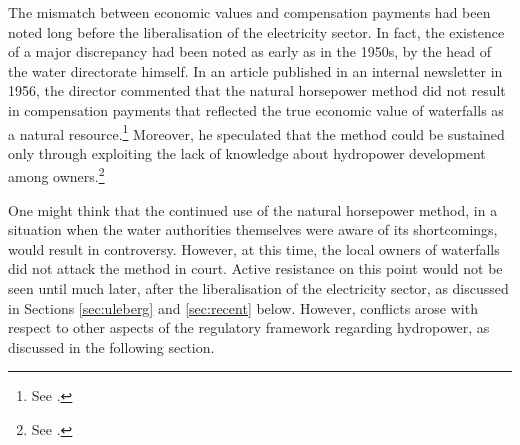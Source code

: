 The mismatch between economic values and compensation payments had been noted long before the liberalisation of the electricity sector. In fact, the existence of a major discrepancy had been noted as early as in the 1950s, by the head of the water directorate himself. In an article published in an internal newsletter in 1956, the director commented that the natural horsepower method did not result in compensation payments that reflected the true economic value of waterfalls as a natural resource.\footnote{See \cite{rogstad56}.} Moreover, he speculated that the method could be sustained only through exploiting the lack of knowledge about hydropower development among owners.\footnote{See \cite{rogstad56}.}

One might think that the continued use of the natural horsepower method, in a situation when the water authorities themselves were aware of its shortcomings, would result in controversy. However, at this time, the local owners of waterfalls did not attack the method in court. Active resistance on this point would not be seen until much later, after the liberalisation of the electricity sector, as discussed in Sections \ref{sec:uleberg} and \ref{sec:recent} below. However, conflicts arose with respect to other aspects of the regulatory framework regarding hydropower, as discussed in the following section.


